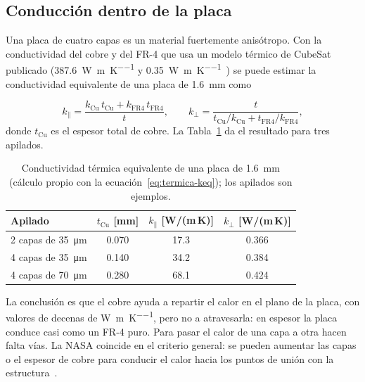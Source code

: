 \subsection{Conducción dentro de la placa}\label{sec:termica-pcb}

Una placa de cuatro capas es un material fuertemente anisótropo. Con la conductividad del cobre y del FR-4 que usa un modelo térmico de CubeSat publicado (\SI{387,6}{\watt\per\metre\per\kelvin} y \SI{0,35}{\watt\per\metre\per\kelvin}~\cite{guerra18}) se puede estimar la conductividad equivalente de una placa de \SI{1,6}{\milli\metre} como

\begin{equation}\label{eq:termica-keq}
  k_\parallel = \frac{k_{\mathrm{Cu}}\,t_{\mathrm{Cu}} + k_{\mathrm{FR4}}\,t_{\mathrm{FR4}}}{t}, \qquad k_\perp = \frac{t}{t_{\mathrm{Cu}}/k_{\mathrm{Cu}} + t_{\mathrm{FR4}}/k_{\mathrm{FR4}}},
\end{equation}
donde $t_{\mathrm{Cu}}$ es el espesor total de cobre. La Tabla~\ref{tab:termica-keq} da el resultado para tres apilados.

\begin{table}[H]
  \centering
  \caption[Conductividad equivalente de una placa de 1,6 mm.]{Conductividad térmica equivalente de una placa de \SI{1,6}{\milli\metre} (cálculo propio con la ecuación~\eqref{eq:termica-keq}); los apilados son ejemplos.}\label{tab:termica-keq}
  \begin{tabular}{@{}lccc@{}}
    \toprule
    Apilado & $t_{\mathrm{Cu}}$ [mm] & $k_\parallel$ [W/(m\,K)] & $k_\perp$ [W/(m\,K)] \\
    \midrule
    2 capas de \SI{35}{\micro\metre}  & \num{0,070} & \num{17,3} & \num{0,366} \\
    4 capas de \SI{35}{\micro\metre}  & \num{0,140} & \num{34,2} & \num{0,384} \\
    4 capas de \SI{70}{\micro\metre}  & \num{0,280} & \num{68,1} & \num{0,424} \\
    \bottomrule
  \end{tabular}
\end{table}

La conclusión es que el cobre ayuda a repartir el calor en el plano de la placa, con valores de decenas de \si{\watt\per\metre\per\kelvin}, pero no a atravesarla: en espesor la placa conduce casi como un FR-4 puro. Para pasar el calor de una capa a otra hacen falta vías. La NASA coincide en el criterio general: se pueden aumentar las capas o el espesor de cobre para conducir el calor hacia los puntos de unión con la estructura~\cite{nasasoa}.

